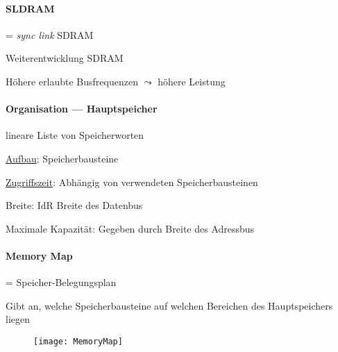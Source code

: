 \newpage

\paragraph{SLDRAM}
\begin{items}
	\item = \emph{sync link} SDRAM
	\item Weiterentwicklung SDRAM
	\item Höhere erlaubte Busfrequenzen \( \leadsto \) höhere Leistung
\end{items}

\paragraph{Organisation --- Hauptspeicher}
\begin{items}
	\item lineare Liste von Speicherworten
	\item \underline{Aufbau}: Speicherbausteine
	\item \underline{Zugriffszeit}: Abhängig von verwendeten Speicherbausteinen
	\item Breite: IdR Breite des Datenbus
	\item Maximale Kapazität: Gegeben durch Breite des Adressbus
\end{items}

\paragraph{Memory Map}
\begin{items}
	\item = Speicher-Belegungsplan
	\item Gibt an, welche Speicherbausteine auf welchen Bereichen des Hauptspeichers liegen
\end{items}
\begin{figure}[H]\centering\label{MemoryMap}\texttt{[image: MemoryMap]}\end{figure}